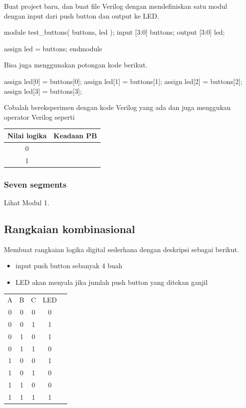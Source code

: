 \documentclass[a4paper,11pt,bahasa]{extarticle}
\begin{document}
Buat project baru, dan buat file Verilog dengan mendefiniskan satu modul
dengan input dari push button dan output ke LED.
\begin{verilogcode}
module test_buttons( buttons, led );
  input  [3:0] buttons;
  output [3:0] led;

  assign led = buttons;
endmodule
\end{verilogcode}

Bisa juga menggunakan potongan kode berikut.
\begin{verilogcode}
  assign led[0] = buttons[0];
  assign led[1] = buttons[1];
  assign led[2] = buttons[2];
  assign led[3] = buttons[3];
\end{verilogcode}

Cobalah bereksperimen dengan kode Verilog yang ada dan juga menggukan operator Verilog
seperti 

\begin{table}[H]
\centering
\begin{tabular}{|c|c|}
\hline
Nilai logika & Keadaan PB \\
\hline
0 & \\
1 & \\
\hline
\end{tabular}
\par
\end{table}

\subsubsection{Seven segments}

Lihat Modul 1.



\subsection{Rangkaian kombinasional}

Membuat rangkaian logika digital sederhana dengan deskripsi sebagai berikut.

\begin{itemize}
\item input push button sebanyak 4 buah
\item LED akan menyala jika jumlah push button yang ditekan ganjil
\end{itemize}

\begin{tabular}{|cccc|c|}
 A  &  B  &  C  & LED \\
 0  &  0  &  0  &  0  \\
 0  &  0  &  1  &  1  \\
 0  &  1  &  0  &  1  \\
 0  &  1  &  1  &  0  \\
 1  &  0  &  0  &  1  \\
 1  &  0  &  1  &  0  \\
 1  &  1  &  0  &  0  \\
 1  &  1  &  1  &  1  \\
\end{tabular}
\end{document}
